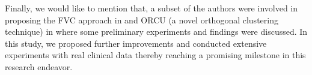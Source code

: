 
Finally, we would like to mention that, a subset of the authors were involved in proposing the FVC approach in \cite{mehedy-masud:2017:fvc} and ORCU (a novel orthogonal clustering technique) in \cite{mehedy-masud:2018:frmwrk} where some preliminary experiments and findings were discussed. In this study, we proposed further improvements  \cite{mehedy-masud:2017:fvc,mehedy-masud:2018:frmwrk} and conducted extensive experiments with real clinical data thereby reaching a promising milestone in this research endeavor.